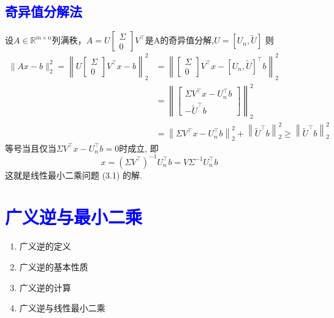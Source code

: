 \documentclass[12pt,a4paper]{article}
\begin{document}
\subsection{\textcolor{blue}{奇异值分解法}}
设$A \in \mathbb{R}^{m \times n}$列满秩，$A=U\left[\begin{array}{l}{\Sigma} \\ {0}\end{array}\right] V^{\top}$是A的奇异值分解,$U=\left[U_{n}, \tilde{U}\right]$
则
$$
\begin{aligned}\|A x-b\|_{2}^{2}=\left\|U\left[\begin{array}{c}{\Sigma} \\ {0}\end{array}\right] V^{\top} x-b\right\|_{2}^{2} &=\left\|\left[\begin{array}{c}{\Sigma} \\ {0}\end{array}\right] V^{\top} x-\left[U_{n}, \tilde{U}\right]^{\top} b\right\|_{2}^{2} \\ &=\left\|\left[\begin{array}{c}{\Sigma V^{\top} x-U_{n}^{\top} b} \\ {-\tilde{U}^{\top} b}\end{array}\right]\right\|_{2}^{2} \\ &=\left\|\Sigma V^{\top} x-U_{n}^{\top} b\right\|_{2}^{2}+\left\|\tilde{U}^{\top} b\right\|_{2}^{2} \geq\left\|\tilde{U}^{\top} b\right\|_{2}^{2} \end{aligned}
$$
等号当且仅当$\Sigma V^{\top} x-U_{n}^{\top} b=0$时成立, 即
$$
x=\left(\Sigma V^{\top}\right)^{-1} U_{n}^{\top} b=V \Sigma^{-1} U_{n}^{\top} b
$$
这就是线性最小二乘问题 (3.1) 的解.
\section{\textcolor{blue}{广义逆与最小二乘}}
\begin{enumerate}[6.1]
\item  广义逆的定义
\item 广义逆的基本性质
\item 广义逆的计算
\item 广义逆与线性最小二乘
\end{enumerate}
\end{document}

